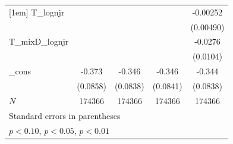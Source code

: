 \begin{table}[htbp]
\begin{tabular}{l*{4}{c}}
[1em]
T\_lognjr    &                     &                     &                     &    -0.00252         \\
            &                     &                     &                     &   (0.00490)         \\
[1em]
T\_mixD\_lognjr&                     &                     &                     &     -0.0276\sym{***}\\
            &                     &                     &                     &    (0.0104)         \\
[1em]
\_cons      &      -0.373\sym{***}&      -0.346\sym{***}&      -0.346\sym{***}&      -0.344\sym{***}\\
            &    (0.0858)         &    (0.0838)         &    (0.0841)         &    (0.0838)         \\
\hline
\(N\)       &      174366         &      174366         &      174366         &      174366         \\
\hline\hline
\multicolumn{5}{l}{\footnotesize Standard errors in parentheses}\\
\multicolumn{5}{l}{\footnotesize \sym{*} \(p<0.10\), \sym{**} \(p<0.05\), \sym{***} \(p<0.01\)}\\
\end{tabular}
\end{table}

